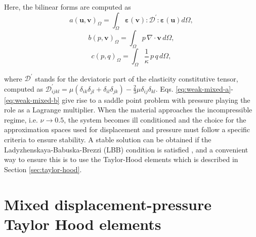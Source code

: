 \documentclass[english,11pt,3p,number,sort&compress]{elsarticle}
\begin{document}
\noindent Here, the bilinear forms are computed as
\begin{equation*}
	a\left(\bm{u},\bm{v}\right)_\Omega = \int_{\Omega} \bm{\varepsilon}(\bm{v}) : \mathcal{D}^{'} : \bm{\varepsilon}(\bm{u}) d\Omega ,
\end{equation*}
\begin{equation*}
	b\left(p, \bm{v}\right)_\Omega = \int_{\Omega} p \,\nabla \cdot \bm{v} \, d\Omega ,
\end{equation*}
\begin{equation*}
	c\left(p,q \right)_\Omega = \int_{\Omega} \frac{1}{\kappa} \,p \,q \, d\Omega ,
\end{equation*}

\noindent where $\mathcal{D}^{'}$ stands for the deviatoric part of the elasticity constitutive tensor, computed as $\mathcal{D}^{'}_{ijkl} = \mu(\delta_{ik}\delta_{jl}+\delta_{il}\delta_{jk})-\frac{2}{3}\mu\delta_{ij}\delta_{kl}$. Eqs. \eqref{eq:weak-mixed-a}-\eqref{eq:weak-mixed-b} give rise to a saddle point problem with pressure playing the role as a Lagrange multiplier. When the material approaches the incompressible regime, i.e. $\nu \rightarrow 0.5$, the system becomes ill conditioned and the choice for the approximation spaces used for displacement and pressure must follow a specific criteria to ensure stability. A stable solution can be obtained if the Ladyzhenskaya-Babuska-Brezzi (LBB) condition is satisfied \cite{brezzi2012mixed}, and a convenient way to ensure this is to use the Taylor-Hood elements \cite{taylor1973numerical} which is described in Section \ref{sec:taylor-hood}.

\section{Mixed displacement-pressure Taylor Hood elements \label{sec:taylor-hood}}
\end{document}
